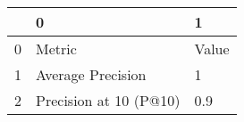 \begin{tabular}{lll}
\toprule
{} &                       0 &      1 \\
\midrule
0 &                  Metric &  Value \\
1 &       Average Precision &      1 \\
2 &  Precision at 10 (P@10) &    0.9 \\
\bottomrule
\end{tabular}

